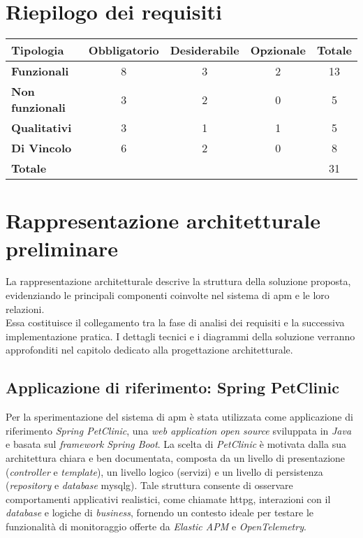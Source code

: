 \newpage
\section{Riepilogo dei requisiti}

\begin{center}
\label{tab:requisiti-riepilogo}
\begin{tabular}{|l|c|c|c|c|}
\hline
\textbf{Tipologia} & \textbf{Obbligatorio} & \textbf{Desiderabile} & \textbf{Opzionale} & \textbf{Totale} \\
\hline
\textbf{Funzionali} & 8 & 3 & 2 & 13 \\
\hline

\hline
\textbf{Non funzionali} & 3 & 2 & 0 & 5 \\
\hline

\hline
\textbf{Qualitativi} & 3 & 1 & 1 & 5 \\
\hline

\hline
\textbf{Di Vincolo} & 6 & 2 & 0 & 8 \\
\hline

\hline
\textbf{Totale} &  &  &  & 31 \\
\hline

\end{tabular}
\end{center}

\newpage
\section{Rappresentazione architetturale preliminare}
La rappresentazione architetturale descrive la struttura della soluzione proposta, evidenziando le principali componenti coinvolte nel sistema di \gls{apm} e le loro relazioni. \\
Essa costituisce il collegamento tra la fase di analisi dei requisiti e la successiva implementazione pratica. I dettagli tecnici e i diagrammi della soluzione verranno approfonditi nel capitolo dedicato alla progettazione architetturale.


\subsection{Applicazione di riferimento: Spring PetClinic}
Per la sperimentazione del sistema di \gls{apm} è stata utilizzata come applicazione di riferimento \emph{Spring PetClinic}, una \emph{web application} \emph{open source} sviluppata in \emph{Java} e basata sul \emph{framework} \emph{Spring Boot}.  
La scelta di \emph{PetClinic} è motivata dalla sua architettura chiara e ben documentata, composta da un livello di presentazione (\emph{controller} e \emph{template}), un livello logico (servizi) e un livello di persistenza (\emph{repository} e \emph{database} \gls{mysqlg}\glsfirstoccur).  
Tale struttura consente di osservare comportamenti applicativi realistici, come chiamate \gls{httpg}\glsfirstoccur, interazioni con il \emph{database} e logiche di \emph{business}, fornendo un contesto ideale per testare le funzionalità di monitoraggio offerte da \emph{Elastic APM} e \emph{OpenTelemetry}.  

